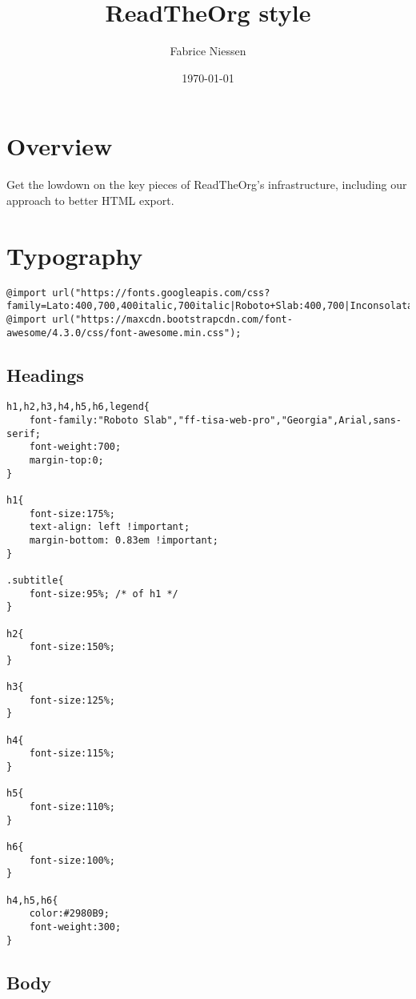 \documentclass[11pt]{article}
\author{Fabrice Niessen}
\date{\today}
\title{ReadTheOrg style}
\begin{document}
\maketitle
\setcounter{tocdepth}{2}
\tableofcontents


\section{Overview}
\label{sec:org645b73a}

Get the lowdown on the key pieces of ReadTheOrg's infrastructure, including our
approach to better HTML export.

\section{Typography}
\label{sec:orgf110d6d}
\begin{verbatim}
@import url("https://fonts.googleapis.com/css?family=Lato:400,700,400italic,700italic|Roboto+Slab:400,700|Inconsolata:400,700");
@import url("https://maxcdn.bootstrapcdn.com/font-awesome/4.3.0/css/font-awesome.min.css");
\end{verbatim}

\subsection{Headings}
\label{sec:orgd9ba483}

\begin{verbatim}
h1,h2,h3,h4,h5,h6,legend{
    font-family:"Roboto Slab","ff-tisa-web-pro","Georgia",Arial,sans-serif;
    font-weight:700;
    margin-top:0;
}

h1{
    font-size:175%;
    text-align: left !important;
    margin-bottom: 0.83em !important;
}

.subtitle{
    font-size:95%; /* of h1 */
}

h2{
    font-size:150%;
}

h3{
    font-size:125%;
}

h4{
    font-size:115%;
}

h5{
    font-size:110%;
}

h6{
    font-size:100%;
}

h4,h5,h6{
    color:#2980B9;
    font-weight:300;
}
\end{verbatim}

\subsection{Body}
\label{sec:org32edc37}
\end{document}
